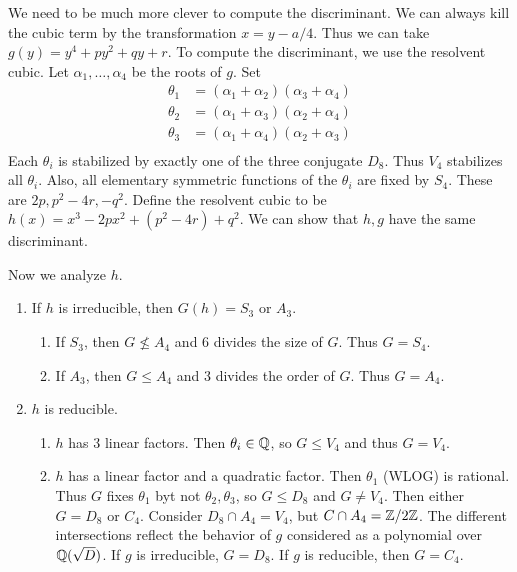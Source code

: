 \documentclass[10pt, twoside]{article}
\begin{document}
        We need to be much more clever to compute the discriminant. We can always kill the cubic term by the transformation $x = y-a/4$. Thus we can take $g(y) = y^4 + py^2 + qy + r$. To compute the discriminant, we use the resolvent cubic. Let $\alpha_1, \ldots, \alpha_4$ be the roots of $g$. Set
        \begin{align*}
            \theta_1 &= (\alpha_1 + \alpha_2)(\alpha_3 + \alpha_4) \\
            \theta_2 &= (\alpha_1 + \alpha_3)(\alpha_2 + \alpha_4) \\
            \theta_3 &= (\alpha_1 + \alpha_4)(\alpha_2 + \alpha_3) \\
        \end{align*}
        Each $\theta_i$ is stabilized by exactly one of the three conjugate $D_8$. Thus $V_4$ stabilizes all $\theta_i$. Also, all elementary symmetric functions of the $\theta_i$ are fixed by $S_4$. These are $2p, p^2-4r, -q^2$. Define the resolvent cubic to be $h(x) = x^3 - 2px^2 + (p^2-4r) + q^2$. We can show that $h,g$ have the same discriminant.

        Now we analyze $h$.
        \begin{enumerate}
            \item If $h$ is irreducible, then $G(h) = S_3$ or $A_3$.
            \begin{enumerate}[label=(\alph*)]
                \item If $S_3$, then $G \not\leq A_4$ and $6$ divides the size of $G$. Thus $G = S_4$.
                \item If $A_3$, then $G \leq A_4$ and $3$ divides the order of $G$. Thus $G = A_4$.
            \end{enumerate}
            \item $h$ is reducible.
                \begin{enumerate}
                    \item $h$ has $3$ linear factors. Then $\theta_i \in \mathbb{Q}$, so $G \leq V_4$ and thus $G = V_4$.
                    \item $h$ has a linear factor and a quadratic factor. Then $\theta_1$ (WLOG) is rational. Thus $G$ fixes $\theta_1$ byt not $\theta_2, \theta_3$, so $G \leq D_8$ and $G \neq V_4$. Then either $G = D_8$ or $C_4$. Consider $D_8 \cap A_4 = V_4$, but $C \cap A_4 = \mathbb{Z}/2\mathbb{Z}$. The different intersections reflect the behavior of $g$ considered as a polynomial over $\mathbb{Q}(\sqrt{D})$. If $g$ is irreducible, $G = D_8$. If $g$ is reducible, then $G = C_4$.
                \end{enumerate}
        \end{enumerate}
        
\end{document}
